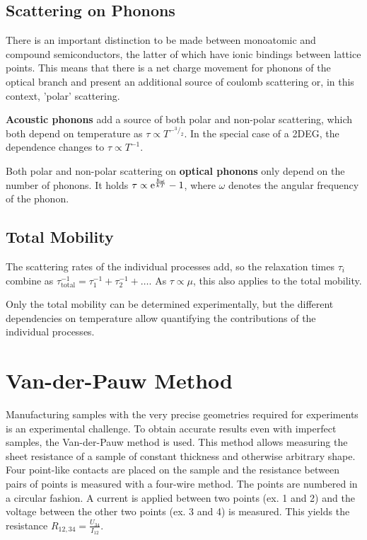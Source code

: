 \subsection{Scattering on Phonons}
There is an important distinction to be made between monoatomic and compound semiconductors, the latter of which have ionic bindings between lattice points.
This means that there is a net charge movement for phonons of the optical branch and present an additional source of coulomb scattering or, in this context, 'polar' scattering.

\textbf{Acoustic phonons} add a source of both polar and non-polar scattering, which both depend on temperature as $\tau \propto T^{-{^3}/_2}$.
In the special case of a 2DEG, the dependence changes to $\tau \propto T^{-1}$.

Both polar and non-polar scattering on \textbf{optical phonons} only depend on the number of phonons.
It holds $\tau \propto \mathrm{e}^\frac{\hbar \omega}{k T} - 1$, where $\omega$ denotes the angular frequency of the phonon.

\subsection{Total Mobility}
The scattering rates of the individual processes add, so the relaxation times $\tau_i$ combine as $\tau_\text{total}^{-1} = \tau_1^{-1} + \tau_2^{-1} + \dots$.
As $\tau \propto \mu$, this also applies to the total mobility.

Only the total mobility can be determined experimentally, but the different dependencies on temperature allow quantifying the contributions of the individual processes.

\section{Van-der-Pauw Method}\label{sec:van-der-pauw-geometry}
Manufacturing samples with the very precise geometries required for experiments is an experimental challenge.
To obtain accurate results even with imperfect samples, the Van-der-Pauw method is used.
This method allows measuring the sheet resistance of a sample of constant thickness and otherwise arbitrary shape.
Four point-like contacts are placed on the sample and the resistance between pairs of points is measured with a four-wire method.
The points are numbered in a circular fashion.
A current is applied between two points (ex. 1 and 2) and the voltage between the other two points (ex. 3 and 4) is measured.
This yields the resistance $R_{12,34} = \frac{U_{34}}{I_{12}}$.


